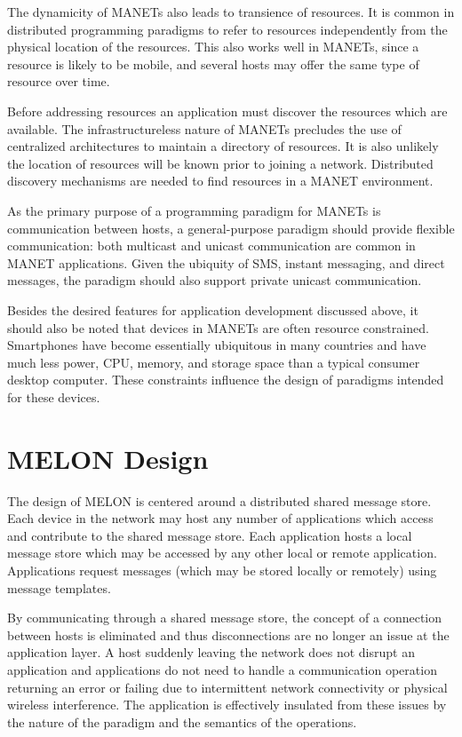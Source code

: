 \documentclass[lnicst]{svmultln}
\begin{document}
The dynamicity of MANETs also leads to transience of resources. It is common in distributed programming paradigms to refer to resources independently from the physical location of the resources. This also works well in MANETs, since a resource is likely to be mobile, and several hosts may offer the same type of resource over time.

Before addressing resources an application must discover the resources which are available. The infrastructureless nature of MANETs precludes the use of centralized architectures to maintain a directory of resources. It is also unlikely the location of resources will be known prior to joining a network. Distributed discovery mechanisms are needed to find resources in a MANET environment.

As the primary purpose of a programming paradigm for MANETs is communication between hosts, a general-purpose paradigm should provide flexible communication: both multicast and unicast communication are common in MANET applications. Given the ubiquity of SMS, instant messaging, and direct messages, the paradigm should also support private unicast communication.

Besides the desired features for application development discussed above, it should also be noted that devices in MANETs are often resource constrained. Smartphones have become essentially ubiquitous in many countries and have much less power, CPU, memory, and storage space than a typical consumer desktop computer. These constraints influence the design of paradigms intended for these devices.

\section{MELON Design}\label{sec:design}

The design of MELON is centered around a distributed shared message store. Each device in the network may host any number of applications which access and contribute to the shared message store. Each application hosts a local message store which may be accessed by any other local or remote application. Applications request messages (which may be stored locally or remotely) using message templates.

By communicating through a shared message store, the concept of a connection between hosts is eliminated and thus disconnections are no longer an issue at the application layer. A host suddenly leaving the network does not disrupt an application and applications do not need to handle a communication operation returning an error or failing due to intermittent network connectivity or physical wireless interference. The application is effectively insulated from these issues by the nature of the paradigm and the semantics of the operations.
\end{document}
